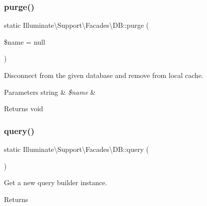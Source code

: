 \subsubsection{\texorpdfstring{purge()}{purge()}}
{\footnotesize\ttfamily static Illuminate\textbackslash{}\+Support\textbackslash{}\+Facades\textbackslash{}\+D\+B\+::purge (\begin{DoxyParamCaption}\item[{}]{\$name = {\ttfamily null} }\end{DoxyParamCaption})\hspace{0.3cm}{\ttfamily [static]}}

Disconnect from the given database and remove from local cache.


\begin{DoxyParams}[1]{Parameters}
string & {\em \$name} & \\
\hline
\end{DoxyParams}
\begin{DoxyReturn}{Returns}
void 
\end{DoxyReturn}
\mbox{\label{class_illuminate_1_1_support_1_1_facades_1_1_d_b_ae52c1b74f0ded858ed2dae6342fe5d96}} 
\subsubsection{\texorpdfstring{query()}{query()}}
{\footnotesize\ttfamily static Illuminate\textbackslash{}\+Support\textbackslash{}\+Facades\textbackslash{}\+D\+B\+::query (\begin{DoxyParamCaption}{ }\end{DoxyParamCaption})\hspace{0.3cm}{\ttfamily [static]}}

Get a new query builder instance.

\begin{DoxyReturn}{Returns}

\end{DoxyReturn}
\mbox{\label{class_illuminate_1_1_support_1_1_facades_1_1_d_b_ac62a351aae4b9c2bcb266ac28304c147}} 
